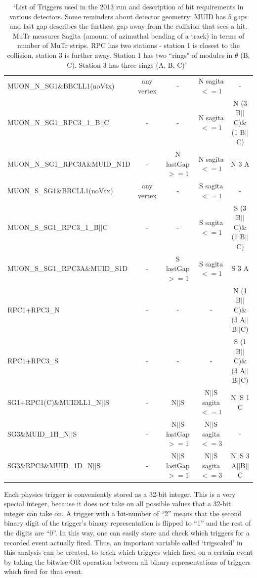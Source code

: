 \begin{table}
{\begin{tabular}{l c c c c}
      MUON\_N\_SG1\&BBCLL1(noVtx) & any vertex & - & N sagita $<= 1$ & - \\
      MUON\_N\_SG1\_RPC3\_1\_B$||$C & - & - & N sagita $<= 1$ & N (3 B$||$C)\&(1 B$||$C) \\
      MUON\_N\_SG1\_RPC3A\&MUID\_N1D & - & N lastGap $>= 1$ & N sagita $<= 1$ & N 3 A \\
      MUON\_S\_SG1\&BBCLL1(noVtx) & any vertex & - & S sagita $<= 1$ & - \\
      MUON\_S\_SG1\_RPC3\_1\_B$||$C & - & - & S sagita $<= 1$ & S (3 B$||$C)\&(1 B$||$C) \\
      MUON\_S\_SG1\_RPC3A\&MUID\_S1D & - & S lastGap $>= 1$ & S sagita $<= 1$ & S 3 A \\
      RPC1+RPC3\_N & - & - & - & N (1 B$||$C)\&(3 A$||$B$||$C) \\
      RPC1+RPC3\_S & - & - & - & S (1 B$||$C)\&(3 A$||$B$||$C) \\
      SG1+RPC1(C)\&MUIDLL1\_N$||$S & - & N$||$S & N$||$S sagita $<= 1$ & N$||$S 1 C \\
      SG3\&MUID\_1H\_N$||$S & - & N$||$S lastGap $>= 1$ & N$||$S sagita $<= 3$ & - \\
      SG3\&RPC3\&MUID\_1D\_N$||$S & - & N$||$S lastGap $>= 1$ & N$||$S sagita $<= 3$ & N$||$S 3 A$||$B$||$C \\
      \bottomrule
    \end{tabular}
  }
  \caption{
    `List of Triggers used in the 2013 run and description of hit requirements
    in various detectors. Some reminders about detector geometry: MUID has 5
    gaps and last gap describes the furthest gap away from the collision that
    sees a hit. MuTr measures Sagita (amount of azimuthal bending of a track) in
    terms of number of MuTr strips. RPC has two stations - station 1 is closest
    to the collision, station 3 is further away. Station 1 has two ``rings" of
    modules in $\theta$ (B, C). Station 3 has three rings (A, B,
    C)'~\cite{Jumper2016}
  }
  \label{tab:typical_run}
\end{table}


Each physics trigger is conveniently stored as a 32-bit integer. This is a very
special integer, because it does not take on all possible values that a 32-bit
integer can take on. A trigger with a bit-number of ``2'' means that the second
binary digit of the trigger's binary representation is flipped to ``1'' and the
rest of the digits are ``0''. In this way, one can easily store and check which
triggers for a recorded event actually fired. Thus, an important variable called
`trigscaled' in this analysis can be created, to track which triggers which
fired on a certain event by taking the bitwise-OR operation between all binary
representations of triggers which fired for that event.

